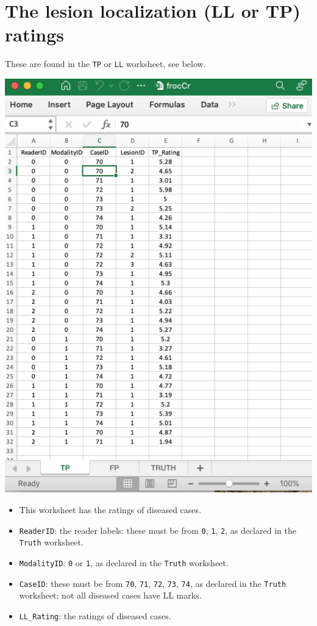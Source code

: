 \documentclass[
]{book}
\providecommand{\tightlist}{%
  \setlength{\itemsep}{0pt}\setlength{\parskip}{0pt}}
\begin{document}
\hypertarget{the-lesion-localization-ll-or-tp-ratings}{%
\section{The lesion localization (LL or TP) ratings}\label{the-lesion-localization-ll-or-tp-ratings}}

These are found in the \texttt{TP} or \texttt{LL} worksheet, see below.

\includegraphics[width=1\textwidth,height=\textheight]{images/software-details/frocCrTp.png}

\begin{itemize}
\tightlist
\item
  This worksheet has the ratings of diseased cases.
\item
  \texttt{ReaderID}: the reader labels: these must be from \texttt{0}, \texttt{1}, \texttt{2}, as declared in the \texttt{Truth} worksheet.
\item
  \texttt{ModalityID}: \texttt{0} or \texttt{1}, as declared in the \texttt{Truth} worksheet.
\item
  \texttt{CaseID}: these must be from \texttt{70}, \texttt{71}, \texttt{72}, \texttt{73}, \texttt{74}, as declared in the \texttt{Truth} worksheet; not all diseased cases have LL marks.\\
\item
  \texttt{LL\_Rating}: the ratings of diseased cases.
\end{itemize}

  
\end{document}
